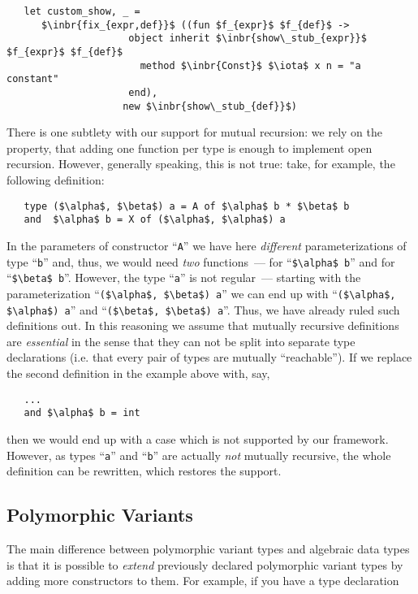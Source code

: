 \begin{lstlisting}
   let custom_show, _ =
      $\inbr{fix_{expr,def}}$ ((fun $f_{expr}$ $f_{def}$ ->
                     object inherit $\inbr{show\_stub_{expr}}$ $f_{expr}$ $f_{def}$
                       method $\inbr{Const}$ $\iota$ x n = "a constant"
                     end),
                    new $\inbr{show\_stub_{def}}$) 
\end{lstlisting}

There is one subtlety with our support for mutual recursion: we rely on the property, that adding one function per type is enough to implement open recursion.
However, generally speaking, this is not true: take, for example, the following definition:

\begin{lstlisting}
   type ($\alpha$, $\beta$) a = A of $\alpha$ b * $\beta$ b
   and  $\alpha$ b = X of ($\alpha$, $\alpha$) a
\end{lstlisting}

In the parameters of constructor ``\lstinline{A}'' we have here \emph{different} parameterizations of type ``\lstinline{b}'' and, thus, we would need
\emph{two} functions~--- for ``\lstinline{$\alpha$ b}'' and for ``\lstinline{$\beta$ b}''. However, the type ``\lstinline{a}'' is not regular~--- starting with 
the parameterization ``\lstinline{($\alpha$, $\beta$) a}'' we can end up with ``\lstinline{($\alpha$, $\alpha$) a}'' and ``\lstinline{($\beta$, $\beta$) a}''.
Thus, we have already ruled such definitions out. In this reasoning we assume that mutually recursive definitions are \emph{essential} in the sense that they
can not be split into separate type declarations (i.e. that every pair of types are mutually ``reachable''). If we replace the second definition in the
example above with, say,

\begin{lstlisting}
   ...
   and $\alpha$ b = int
\end{lstlisting}

then we would end up with a case which is not supported by our framework. However, as types ``\lstinline{a}'' and ``\lstinline{b}'' are actually \emph{not}
mutually recursive, the whole definition can be rewritten, which restores the support.

\subsection{Polymorphic Variants}
\label{pv}

The main difference between polymorphic variant types and algebraic data types is that it is possible to \emph{extend} previously declared polymorphic variant types by adding more constructors to them. For example, if you have a type declaration 

